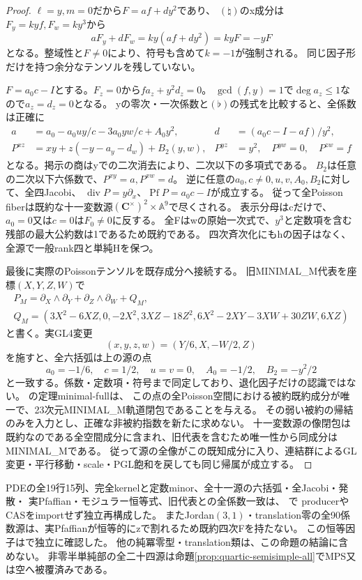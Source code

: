 \documentclass[a4paper,11pt]{ltjsarticle}
\theoremstyle{definition}
\newcommand{\CC}{\mathbf C}
\begin{document}
\begin{proof}
$\ell=y,m=0$だから$F=af+dy^2$であり、
$(\natural)$のx成分は$F_y=kyf,F_w=ky^3$から
\[
 aF_y+dF_w=ky(af+dy^2)=kyF=-yF
\]
となる。整域性と$F\ne0$により、符号も含めて$k=-1$が強制される。
同じ因子形だけを持つ余分なテンソルを残していない。

$F=a_0c-I$とする。$F_z=0$から$fa_z+y^2d_z=0$。
$\gcd(f,y)=1$で$\deg a_z\le1$なので$a_z=d_z=0$となる。
yの零次・一次係数と$(\flat)$の残式を比較すると、全係数は正確に
\[
\begin{aligned}
 a&=a_0-a_0uy/c-3a_0yw/c+A_0y^2,&
 d&=(a_0c-I-af)/y^2,\\
 P^{xz}&=xy+z(-y-a_y-d_w)+B_2(y,w),&
 P^{yz}&=y^2,\quad P^{yw}=0,\quad P^{zw}=f
\end{aligned}
\]
となる。掲示の商はyでの二次消去により、二次以下の多項式である。
$B_2$は任意の二次以下六係数で、$P^{xy}=a,P^{xw}=d$。
逆に任意の$a_0,c\ne0,u,v,A_0,B_2$に対して、全四Jacobi、
$\operatorname{div}P=y\partial_x$、$\operatorname{Pf}P=a_0c-I$が成立する。
従って全Poisson fiberは既約な十一変数源$(\CC^\times)^2\times\mathbb A^9$で尽くされる。
表示分母はcだけで、$a_0=0$又は$c=0$は$F_0\ne0$に反する。
全Fはwの原始一次式で、$y^3$と定数項を含む残部の最大公約数は1であるため既約である。
四次斉次化にもhの因子はなく、全源で一般rank四と単純Hを保つ。

最後に実際のPoissonテンソルを既存成分へ接続する。
旧MINIMAL\_M代表を座標$(X,Y,Z,W)$で
\[
\begin{gathered}
 P_M=\partial_X\wedge\partial_Y+\partial_Z\wedge\partial_W+Q_M,\\
 Q_M=(3X^2-6XZ,0,-2X^2,3XZ-18Z^2,
             6X^2-2XY-3XW+30ZW,6XZ)
\end{gathered}
\]
と書く。実GL4変更
\[
 (x,y,z,w)=(Y/6,X,-W/2,Z)
\]
を施すと、全六括弧は上の源の点
\[
 a_0=-1/6,\quad c=1/2,\quad u=v=0,\quad A_0=-1/2,
 \quad B_2=-y^2/2
\]
と一致する。係数・定数項・符号まで同定しており、退化因子だけの認識ではない。
の定理minimal-fullは、
この点の全Poisson空間における被約既約成分が唯一で、23次元MINIMAL\_M軌道閉包であることを与える。
その弱い被約の帰結のみを入力とし、正確な非被約指数を新たに求めない。
十一変数源の像閉包は既約なのである全空間成分に含まれ、旧代表を含むため唯一性から同成分はMINIMAL\_Mである。
従って源の全像がこの既知成分に入り、連結群によるGL変更・平行移動・scale・PGL飽和を戻しても同じ帰属が成立する。
\end{proof}

PDEの全19行15列、完全kernelと定数minor、全十一源の六括弧・全Jacobi・発散・
実Pfaffian・モジュラー恒等式、旧代表との全係数一致は、
で
producerやCASをimportせず独立再構成した。
またJordan$(3,1)$・translation零の全90係数源は、実Pfaffianが恒等的にzで割れるため既約四次Fを持たない。
この恒等因子はで独立に確認した。
他の純冪零型・translation類は、この命題の結論に含めない。
非零半単純部の全二十四源は命題\ref{prop:quartic-semisimple-all}でMPS又は空へ被覆済みである。
\end{document}
